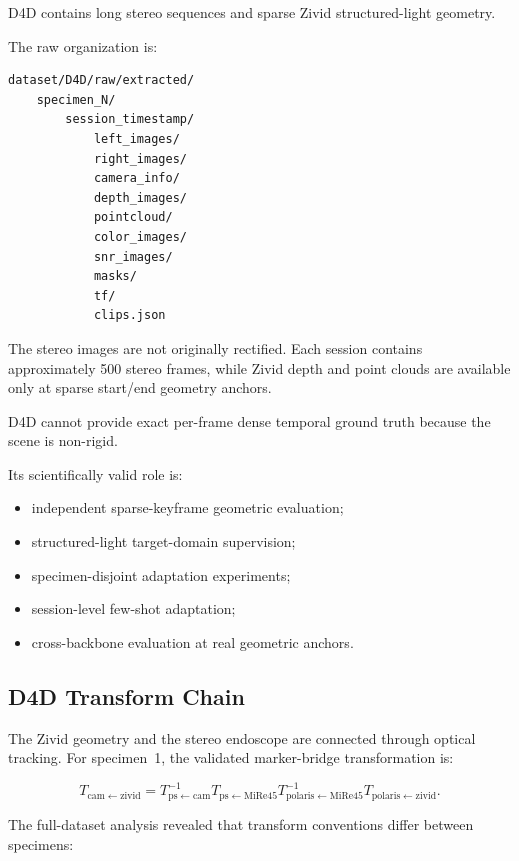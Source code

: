 \documentclass[11pt,a4paper]{article}
\begin{document}
D4D contains long stereo sequences and sparse Zivid structured-light geometry.

The raw organization is:

\begin{verbatim}
dataset/D4D/raw/extracted/
    specimen_N/
        session_timestamp/
            left_images/
            right_images/
            camera_info/
            depth_images/
            pointcloud/
            color_images/
            snr_images/
            masks/
            tf/
            clips.json
\end{verbatim}

The stereo images are not originally rectified. Each session contains approximately
500 stereo frames, while Zivid depth and point clouds are available only at sparse
start/end geometry anchors.

D4D cannot provide exact per-frame dense temporal ground truth because the scene is
non-rigid.

Its scientifically valid role is:

\begin{itemize}[leftmargin=*]
    \item independent sparse-keyframe geometric evaluation;
    \item structured-light target-domain supervision;
    \item specimen-disjoint adaptation experiments;
    \item session-level few-shot adaptation;
    \item cross-backbone evaluation at real geometric anchors.
\end{itemize}

\subsection{D4D Transform Chain}

The Zivid geometry and the stereo endoscope are connected through optical tracking.
For specimen~1, the validated marker-bridge transformation is:

\begin{equation}
T_{\mathrm{cam}\leftarrow\mathrm{zivid}}
=
T_{\mathrm{ps}\leftarrow\mathrm{cam}}^{-1}
T_{\mathrm{ps}\leftarrow\mathrm{MiRe45}}
T_{\mathrm{polaris}\leftarrow\mathrm{MiRe45}}^{-1}
T_{\mathrm{polaris}\leftarrow\mathrm{zivid}}.
\end{equation}

The full-dataset analysis revealed that transform conventions differ between
specimens:
\end{document}
